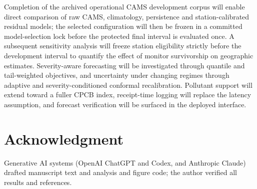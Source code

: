 \documentclass[conference,a4paper]{IEEEtran}
\begin{document}
Completion of the archived operational CAMS development corpus will enable direct comparison of raw CAMS, climatology, persistence and station-calibrated residual models; the selected configuration will then be frozen in a committed model-selection lock before the protected final interval is evaluated once. A subsequent sensitivity analysis will freeze station eligibility strictly before the development interval to quantify the effect of monitor survivorship on geographic estimates. Severity-aware forecasting will be investigated through quantile and tail-weighted objectives, and uncertainty under changing regimes through adaptive and severity-conditioned conformal recalibration. Pollutant support will extend toward a fuller CPCB index, receipt-time logging will replace the latency assumption, and forecast verification will be surfaced in the deployed interface.

\section*{Acknowledgment}
Generative AI systems (OpenAI ChatGPT and Codex, and Anthropic Claude) drafted manuscript text and analysis and figure code; the author verified all results and references.



\end{document}
